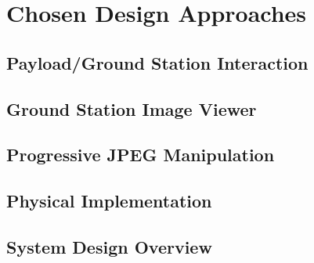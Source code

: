 \chapter{Chosen Design Approaches}




\section{Payload/Ground Station Interaction}

\section{Ground Station Image Viewer}

\section{Progressive JPEG Manipulation}

\section{Physical Implementation}

\section{System Design Overview}

